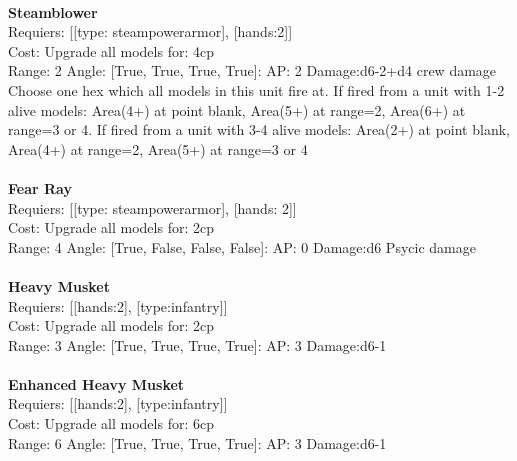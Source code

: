 \ \\
{\bf Steamblower } \\

Requiers: [[type: steampowerarmor], [hands:2]] \\
Cost: Upgrade all models for: 4cp \\


Range: 2  Angle: [True, True, True, True]: AP: 2 Damage:d6-2+d4 crew damage \\
Choose one hex which all models in this unit fire at. If fired from a unit with 1-2 alive models: Area(4+) at point blank, Area(5+) at range=2, Area(6+) at range=3 or 4. If fired from a unit with 3-4 alive models: Area(2+) at point blank, Area(4+) at range=2, Area(5+) at range=3 or 4\\ 








\ \\
{\bf Fear Ray } \\

Requiers: [[type: steampowerarmor], [hands: 2]] \\
Cost: Upgrade all models for: 2cp \\


Range: 4  Angle: [True, False, False, False]: AP: 0 Damage:d6 Psycic damage \\








\ \\
{\bf Heavy Musket } \\

Requiers: [[hands:2], [type:infantry]] \\
Cost: Upgrade all models for: 2cp \\


Range: 3  Angle: [True, True, True, True]: AP: 3 Damage:d6-1 \\








\ \\
{\bf Enhanced Heavy Musket } \\

Requiers: [[hands:2], [type:infantry]] \\
Cost: Upgrade all models for: 6cp \\


Range: 6  Angle: [True, True, True, True]: AP: 3 Damage:d6-1 \\








